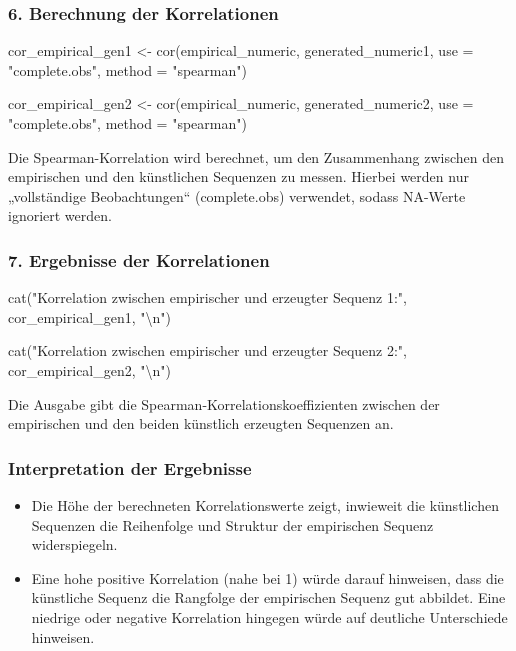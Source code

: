 \documentclass[
]{article}
\begin{document}
\subsubsection{\texorpdfstring{\textbf{6. Berechnung der
Korrelationen}}{6. Berechnung der Korrelationen}}\label{berechnung-der-korrelationen}

cor\_empirical\_gen1 \textless- cor(empirical\_numeric,
generated\_numeric1, use = "complete.obs", method = "spearman")

cor\_empirical\_gen2 \textless- cor(empirical\_numeric,
generated\_numeric2, use = "complete.obs", method = "spearman")

Die Spearman-Korrelation wird berechnet, um den Zusammenhang zwischen
den empirischen und den künstlichen Sequenzen zu messen. Hierbei werden
nur „vollständige Beobachtungen`` (complete.obs) verwendet, sodass
NA-Werte ignoriert werden.

\subsubsection{\texorpdfstring{\textbf{7. Ergebnisse der
Korrelationen}}{7. Ergebnisse der Korrelationen}}\label{ergebnisse-der-korrelationen}

cat("Korrelation zwischen empirischer und erzeugter Sequenz 1:",
cor\_empirical\_gen1, "\textbackslash n")

cat("Korrelation zwischen empirischer und erzeugter Sequenz 2:",
cor\_empirical\_gen2, "\textbackslash n")

Die Ausgabe gibt die Spearman-Korrelationskoeffizienten zwischen der
empirischen und den beiden künstlich erzeugten Sequenzen an.

\subsubsection{\texorpdfstring{\textbf{Interpretation der
Ergebnisse}}{Interpretation der Ergebnisse}}\label{interpretation-der-ergebnisse}

\begin{itemize}
\item
  Die Höhe der berechneten Korrelationswerte zeigt, inwieweit die
  künstlichen Sequenzen die Reihenfolge und Struktur der empirischen
  Sequenz widerspiegeln.
\item
  Eine hohe positive Korrelation (nahe bei 1) würde darauf hinweisen,
  dass die künstliche Sequenz die Rangfolge der empirischen Sequenz gut
  abbildet. Eine niedrige oder negative Korrelation hingegen würde auf
  deutliche Unterschiede hinweisen.
\end{itemize}
\end{document}
